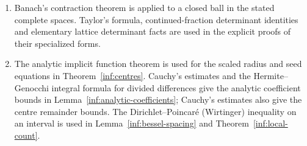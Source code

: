 \begin{enumerate}[label=\textup{(\arabic*)}]
with positive second fundamental form is used in
Lemma~\ref{inf:geometry-convexity}; see
\cite{inf:doCarmoLima,inf:sacksteder}.
Bernstein's inequality for trigonometric polynomials, applied on
great circles, gives the dimension-independent shape derivative
bounds \cite[Vol.~II, Ch.~X, Theorem~3.13]{inf:zygmund}. The Jacobi endpoint bound itself is
proved in Lemma~\ref{inf:angular-sup}.
The rotation argument in Proposition~\ref{inf:arithmetic-density}
uses trigonometric polynomial approximation \cite{inf:zygmund}.
\item Banach's contraction theorem \cite{inf:banach} is applied to
a closed ball in the stated complete spaces.
Taylor's formula, continued-fraction determinant identities and
elementary lattice determinant facts are used in the explicit
proofs of their specialized forms.
\item The analytic implicit function theorem is used for the
scaled radius and seed equations in Theorem~\ref{inf:centres}.
Cauchy's estimates and the Hermite--Genocchi integral formula for
divided differences give the analytic coefficient bounds in
Lemma~\ref{inf:analytic-coefficients}; Cauchy's estimates also
give the centre remainder bounds.
The Dirichlet--Poincar\'e (Wirtinger) inequality on an interval is
used in Lemma~\ref{inf:bessel-spacing} and
Theorem~\ref{inf:local-count}.
\end{enumerate}
